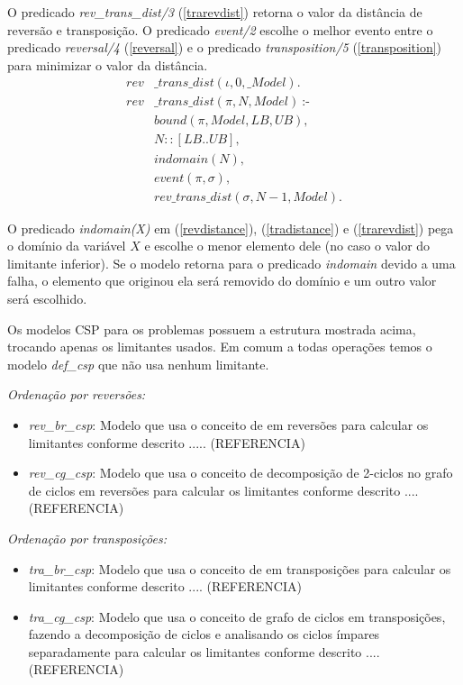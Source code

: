 O predicado \textit{rev\_trans\_dist/3} (\ref{trarevdist}) retorna o
valor da distância de reversão e transposição. O
predicado \textit{event/2} escolhe o melhor evento entre o
predicado \textit{reversal/4} (\ref{reversal}) e o
predicado \textit{transposition/5} (\ref{transposition}) para
minimizar o valor da distância.
\begin{align}
  \label{trarevdist}
  \textit{rev}&\textit{\_trans\_dist}(\iota, 0, \_Model). \nonumber\\
  \textit{rev}&\textit{\_trans\_dist}(\pi, N, Model)~\text{:-} \nonumber\\
  &\textit{bound}(\pi, Model, LB, UB), \nonumber\\
  &N :: [LB .. UB], \\
  &\textit{indomain}(N), \nonumber \\
  &\textit{event}(\pi, \sigma), \nonumber \\
  &\textit{rev\_trans\_dist}(\sigma, N-1, Model). \nonumber
\end{align}

O predicado \textit{indomain(X)} em (\ref{revdistance}),
(\ref{tradistance}) e (\ref{trarevdist}) pega o domínio da variável
$X$ e escolhe o menor elemento dele (no caso o valor do limitante
inferior). Se o modelo retorna para o predicado \textit{indomain}
devido a uma falha, o elemento que originou ela será removido do
domínio e um outro valor será escolhido.

Os modelos CSP para os problemas possuem a estrutura mostrada acima,
trocando apenas os limitantes usados. Em comum a todas operações temos
o modelo \textit{def\_csp} que não usa nenhum limitante.

\textit{Ordenação por reversões:}
\begin{itemize}
\item{\textit{rev\_br\_csp}: 
Modelo que usa o conceito de \bkp{} em reversões para calcular os
limitantes conforme descrito ..... (REFERENCIA)}
\item{\textit{rev\_cg\_csp}:
Modelo que usa o conceito de decomposição de 2-ciclos no grafo de
ciclos em reversões para calcular os limitantes conforme descrito
.... (REFERENCIA)}
\end{itemize}

\textit{Ordenação por transposições:}
\begin{itemize}
\item{\textit{tra\_br\_csp}: 
Modelo que usa o conceito de \bkp{} em transposições para calcular os
limitantes conforme descrito .... (REFERENCIA)}
\item{\textit{tra\_cg\_csp}:
Modelo que usa o conceito de grafo de ciclos em transposições, fazendo
a decomposição de ciclos e analisando os ciclos ímpares separadamente
para calcular os limitantes conforme descrito .... (REFERENCIA)}
\end{itemize}

